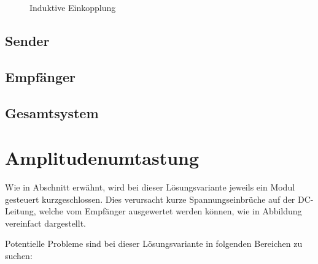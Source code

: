 \begin{figure}[h!tb]
    \centering
    
    \caption{Induktive Einkopplung}
    \label{fig:circ:coupling:inductive}
\end{figure}

\subsection{Sender}
\label{sec:simu:fsk:inductive:transmitter}

\subsection{Empf\"anger}
\label{sec:simu:fsk:inductive:receiver}

\subsection{Gesamtsystem}
\label{sec:simu:fsk:inductive:inductive}


\section{Amplitudenumtastung}
\label{sec:simu:ask}

Wie in Abschnitt  erw\"ahnt, wird bei dieser L\"osungsvariante
jeweils   ein   Modul   gesteuert   kurzgeschlossen. Dies   verursacht   kurze
Spannungseinbr\"uche auf  der DC-Leitung,  welche vom  Empf\"anger ausgewertet
werden k\"onnen, wie in Abbildung vereinfact dargestellt.

Potentielle Probleme sind bei  dieser L\"osungsvariante in folgenden Bereichen
zu suchen:

